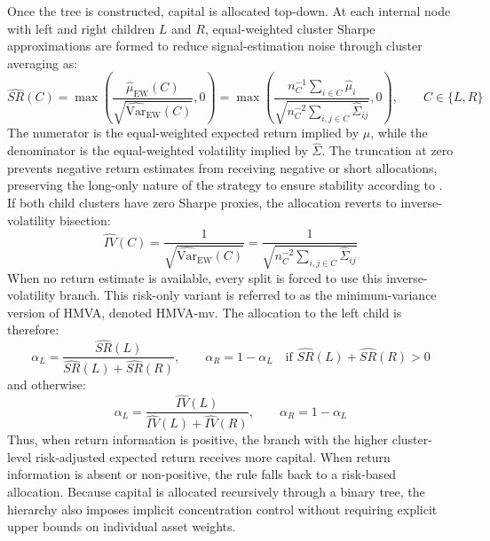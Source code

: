 \documentclass[12pt]{article}
\begin{document}
Once the tree is constructed, capital is allocated top-down. At each internal node with left and right children $L$ and $R$, equal-weighted cluster Sharpe approximations are formed to reduce signal-estimation noise through cluster averaging as:
\begin{equation}
  \widehat{SR}(C) 
  =
  \max\!\left(
    \frac{\hat{\mu}_\mathrm{EW}(C)}
         {\sqrt{\widehat{\mathrm{Var}}_{\mathrm{EW}}(C)}},
    0
  \right)
  =
  \max\!\left(
    \frac{
    n_C^{-1}\sum_{i \in C}\hat{\mu}_{i}
    }{
    \sqrt{n_C^{-2}\sum_{i,j \in C}\hat{\Sigma}_{ij}}
    },
    0
  \right),
  \qquad C\in\{L,R\}
  \label{eq:sharpe-proxy}
\end{equation}
The numerator is the equal-weighted expected return implied by $\hat{\mu}$, while the denominator is the equal-weighted volatility implied by $\hat{\Sigma}$. The truncation at zero prevents negative return estimates from receiving negative or short allocations, preserving the long-only nature of the strategy to ensure stability according to \cite{jagannathanma2003}. If both child clusters have zero Sharpe proxies, the allocation reverts to inverse-volatility bisection:
\begin{equation}
  \widehat{IV}(C)
  =
  \frac{1}{\sqrt{\widehat{\mathrm{Var}}_{\mathrm{EW}}(C)}}
  =
  \frac{
  1
  }{
  \sqrt{n_C^{-2}\sum_{i,j \in C}\hat{\Sigma}_{ij}}
  }
  \label{eq:inv_var}
\end{equation}
When no return estimate is available, every split is forced to use this inverse-volatility branch. This risk-only variant is referred to as the minimum-variance version of HMVA, denoted HMVA-mv. The allocation to the left child is therefore:
\begin{equation}
\alpha_L 
=
\frac{\widehat{SR}(L)}{\widehat{SR}(L)+\widehat{SR}(R)},
\qquad 
\alpha_R = 1-\alpha_L
\quad \text{if } \widehat{SR}(L)+\widehat{SR}(R)>0
\end{equation}
and otherwise:
\begin{equation}
\alpha_L 
=
\frac{\widehat{IV}(L)}{\widehat{IV}(L)+\widehat{IV}(R)},
\qquad 
\alpha_R = 1-\alpha_L
\label{eq:sharpe-alloc}
\end{equation}
Thus, when return information is positive, the branch with the higher cluster-level risk-adjusted expected return receives more capital. When return information is absent or non-positive, the rule falls back to a risk-based allocation. Because capital is allocated recursively through a binary tree, the hierarchy also imposes implicit concentration control without requiring explicit upper bounds on individual asset weights.
\end{document}
